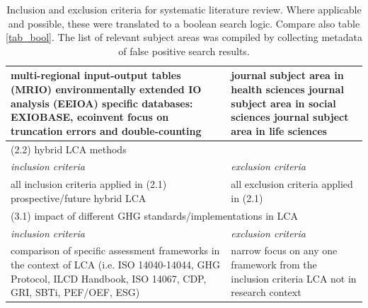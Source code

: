 \documentclass{article}
\begin{document}
\begin{table}[htbp]
\begin{tabularx}{\textwidth}{| X | X |}
                        multi-regional input-output tables (MRIO) \newline
                        environmentally extended IO analysis (EEIOA) \newline
                        specific databases: EXIOBASE, ecoinvent \newline
                        focus on truncation errors and double-counting
                    &
                        journal subject area in health sciences \newline
                        journal subject area in social sciences \newline
                        journal subject area in life sciences
                    \\
                    \hline
                \multicolumn{2}{|l|}{(2.2) hybrid LCA methods}  \\
                    \hline
                    \textit{inclusion criteria} & \textit{exclusion criteria} \\
                    \hline
                        all inclusion criteria applied in (2.1) \newline
                        prospective/future hybrid LCA
                    &
                        all exclusion criteria applied in (2.1)
                    \\
                    \hline
                \multicolumn{2}{|l|}{(3.1) impact of different GHG standards/implementations in LCA}  \\
                    \hline
                    \textit{inclusion criteria} & \textit{exclusion criteria} \\
                    \hline
                        comparison of specific assessment frameworks in the context of LCA\newline
                        (i.e. ISO 14040-14044, GHG Protocol, ILCD Handbook, ISO 14067, CDP, GRI, SBTi, PEF/OEF, ESG)
                    &
                        narrow focus on any one framework from the inclusion criteria \newline
                        LCA not in research context
                    \\
                    \hline
                \end{tabularx}
                \caption{Inclusion and exclusion criteria for systematic literature review. Where applicable and possible, these were translated to a boolean search logic. Compare also table \ref{tab_bool}. The list of relevant subject areas was compiled by collecting metadata of false positive search results.}
                \label{tab_inclusion_exclusion}
            \end{table}
    
\end{document}
